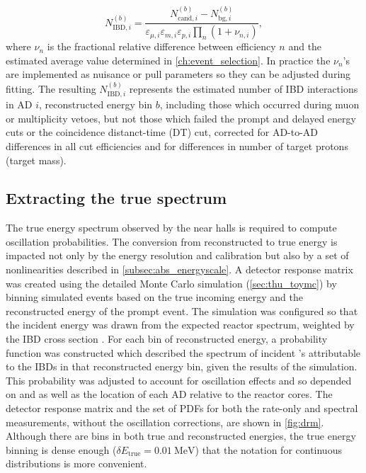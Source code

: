 \begin{equation}\label{eq:near_hall_bg_eff}
    N_{\text{IBD},i}^{(b)} =
    \frac{N_{\text{cand},i}^{(b)} - N_{\text{bg},i}^{(b)}}{
        \varepsilon_{\mu,i}\varepsilon_{m,i}\varepsilon_{p,i}\prod_n(1+\nu_{n,i})
    },
\end{equation}
where $\nu_n$ is the fractional relative difference between efficiency $n$
and the estimated average value determined in \cref{ch:event_selection}.
In practice the $\nu_n$'s are implemented as nuisance or pull parameters
so they can be adjusted during fitting.
The resulting $N_{\text{IBD},i}^{(b)}$ represents
the estimated number of IBD interactions in AD $i$,
reconstructed energy bin $b$,
including those which occurred during muon or multiplicity vetoes,
but not those which failed the prompt and delayed energy cuts
or the coincidence distanct-time (DT) cut,
corrected for AD-to-AD differences in all cut efficiencies
and for differences in number of target protons (target mass).


\subsection{Extracting the true \texorpdfstring{\nuebar{}}{antineutrino} spectrum}
\label{subsec:reco_to_true_energy}

The true \nuebar{} energy spectrum observed by the near halls
is required to compute oscillation probabilities.
The conversion from reconstructed to true energy
is impacted not only by the energy resolution and calibration
but also by a set of nonlinearities described in \cref{subsec:abs_energyscale}.
A detector response matrix was created
using the detailed Monte Carlo simulation (\cref{sec:thu_toymc})
by binning simulated events based on the true incoming \nuebar{} energy
and the reconstructed energy of the prompt event.
The simulation was configured so that the incident \nuebar{} energy
was drawn from the expected reactor \nuebar{} spectrum,
weighted by the IBD cross section .
For each bin of reconstructed energy,
a probability function was constructed
which described the spectrum of incident \nuebar{}'s
attributable to the IBDs in that reconstructed energy bin,
given the results of the simulation.
This probability was adjusted to account for
oscillation effects and so depended on \thetaot{} and \dmee{}
as well as the location of each AD relative to the reactor cores.
The detector response matrix and the set of PDFs
for both the rate-only and spectral measurements,
without the oscillation corrections,
are shown in \cref{fig:drm}.
Although there are bins in both true and reconstructed energies,
the true energy binning is dense enough ($\delta E_{\text{true}} = \SI{0.01}{\MeV}$)
that the notation for continuous distributions is more convenient.

